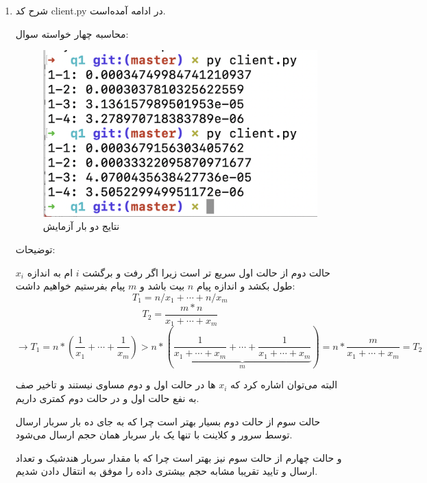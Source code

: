 \documentclass[11pt]{article}
\begin{document}

	\begin{enumerate}[leftmargin=0.26in, font=\huge\bfseries]
		\item %
		شرح کد client.py در ادامه آمده‌است.
	
	محاسبه چهار خواسته سوال:
		\begin{latin}
			
		\end{latin}
		
	
	\begin{figure}
  \includegraphics[width=\linewidth]{Screen Shot 1400-01-22 at 18.51.12.png}
  \caption{نتایج دو بار آزمایش}
  \label{fig:screenshot}
\end{figure}


توضیحات:

حالت دوم از حالت اول سریع تر است زیرا اگر رفت و برگشت $i$ ام به اندازه $x_i$
طول بکشد و اندازه پیام $n$ بیت باشد و $m$ پیام بفرستیم خواهیم داشت:
\begin{equation*}
	T_1 = n/x_1 + \cdots + n/x_m 
\end{equation*}
\begin{equation*}
	T_2 = \frac{m*n}{x_1 + \cdots + x_m}	
\end{equation*}
\begin{equation*}
	\rightarrow T_1 = n*(\frac{1}{x_1} + \cdots + \frac{1}{x_m})
	> n* (\underbrace{\frac{1}{x_1 + \cdots + x_m} + \cdots + \frac{1}{x_1 + \cdots + x_m}}_{m}) = n* \frac{m}{x_1 + \cdots + x_m} = T_2
\end{equation*}

البته می‌توان اشاره کرد که $x_i$ ها در حالت‌ اول و دوم مساوی نیستند و تاخیر صف به نفع حالت اول و در حالت دوم
کمتری داریم.

حالت سوم 
از حالت دوم بسیار بهتر است چرا که به جای ده بار سربار ارسال 
توسط سرور و کلاینت با تنها یک بار سربار همان حجم ارسال می‌شود.
 
و حالت چهارم از حالت سوم نیز بهتر است چرا که با مقدار سربار هندشیک و تعداد ارسال و تایید تقریبا مشابه حجم بیشتری داده را موفق به انتقال دادن شدیم.   

	\end{enumerate}
	
	
\end{document}
